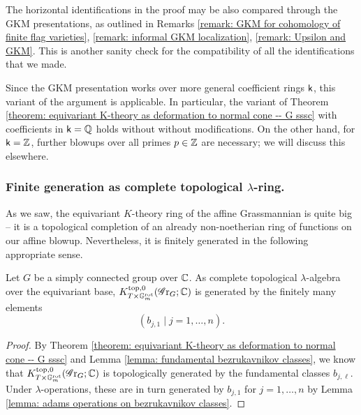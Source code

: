 \begin{remark}
The horizontal identifications in the proof may be also compared through the GKM presentations, as outlined in Remarks \ref{remark: GKM for cohomology of finite flag varieties}, \ref{remark: informal GKM localization}, \ref{remark: Upsilon and GKM}. This is another sanity check for the compatibility of all the identifications that we made.

Since the GKM presentation works over more general coefficient rings $\mathsf{k}$, this variant of the argument is applicable. In particular, the variant of Theorem \ref{theorem: equivariant K-theory as deformation to normal cone -- G sssc} with coefficients in $\mathsf{k} = \operatorname{\mathbb{Q}}$ holds without without modifications. On the other hand, for $\mathsf{k}=\operatorname{\mathbb{Z}}$, further blowups over all primes $p \in \operatorname{\mathbb{Z}}$ are necessary; we will discuss this elsewhere.
\end{remark}



\subsubsection{Finite generation as complete topological $\lambda$-ring.}
As we saw, the equivariant $K$-theory ring of the affine Grassmannian is quite big -- it is a topological completion of an already non-noetherian ring of functions on our affine blowup. Nevertheless, it is finitely generated in the following appropriate sense.
\begin{corollary}\label{corollary: topological Adams generation}
Let $G$ be a simply connected group over $\operatorname{\mathbb{C}}$. As complete topological $\lambda$-algebra over the equivariant base, $K^{\mathrm{top}, 0}_{T \times \mathbb{G}_m^{\mathrm{rot}}}(\operatorname{\mathscr{G}r}_G; \operatorname{\mathbb{C}})$ is generated by the finitely many elements
    \begin{equation*}
        (b_{j, 1} \mid j = 1, \dots, n).
    \end{equation*}
\end{corollary}
\begin{proof}
By Theorem \ref{theorem: equivariant K-theory as deformation to normal cone -- G sssc} and Lemma \ref{lemma: fundamental bezrukavnikov classes}, we know that $K^{\mathrm{top}, 0}_{T \times \mathbb{G}_m^{\mathrm{rot}}}(\operatorname{\mathscr{G}r}_G; \operatorname{\mathbb{C}})$ is topologically generated by the fundamental classes $b_{j, \ell}$. Under $\lambda$-operations, these are in turn generated by $b_{j, 1}$ for $j=1, \dots, n$ by Lemma \ref{lemma: adams operations on bezrukavnikov classes}.
\end{proof}

